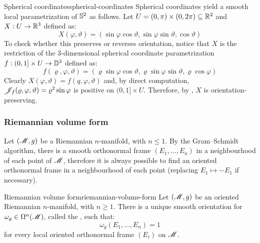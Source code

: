 \begin{example}{Spherical coordinates}{spherical-coordinates}
  Spherical coordinates yield a smooth local parametrization of $ \mathbb{S}^{2} $ as follows. Let $ U = (0,\pi) \times (0,2\pi) \subseteq \mathbb{R}^2 $ and $ X : U \rightarrow \mathbb{R}^3 $ defined as:
  \begin{equation*}
    X(\varphi,\vartheta) = (\sin \varphi \cos \vartheta , \sin \varphi \sin \vartheta , \cos \vartheta)
  \end{equation*}
  To check whether this preserves or reverses orientation, notice that $ X $ is the restriction of the $ 3 $-dimensional spherical coordinate parametrization $ f : (0,1] \times U \rightarrow \mathbb{D}^{3} $ defined as:
  \begin{equation*}
    f(\varrho , \varphi , \vartheta) = (\varrho \sin \varphi \cos \vartheta , \varrho \sin \varphi \sin \vartheta , \varrho \cos \varphi)
  \end{equation*}
  Clearly $ X(\varphi , \vartheta) = f(q , \varphi , \vartheta) $ and, by direct computation, $ \mathscr{J}_{f}(\varrho , \varphi , \vartheta) = \varrho^2 \sin \varphi $ is positive on $ (0,1] \times U $. Therefore, by , $ X $ is orientation-preserving.
\end{example}

\subsubsection{Riemannian volume form}

Let $ (\mathscr{M},g) $ be a Riemannian $ n $-manifold, with $ n \leq 1 $. By the Gram--Schmidt algorithm, there is a smooth orthonormal frame $ (E_1 , \dots , E_n) $ in a neighbourhood of each point of $ \mathscr{M} $, therefore it is always possible to find an oriented orthonormal frame in a neighbourhood of each point (replacing $ E_1 \mapsto -E_1 $ if necessary).

\begin{proposition}{Riemannian volume form}{riemannian-volume-form}
  Let $ (\mathscr{M},g) $ be an oriented Riemannian $ n $-manifold, with $ n \geq 1 $. There is a unique smooth orientation for $ \omega_g \in \Omega^{n}(\mathscr{M}) $, called the , such that:
  \begin{equation}
    \omega_g (E_1 , \dots , E_n) = 1
    \label{eq:riemannian-volume-form-def}
  \end{equation}
  for every local oriented orthonormal frame $ (E_i) $ on $ \mathscr{M} $.
\end{proposition}

